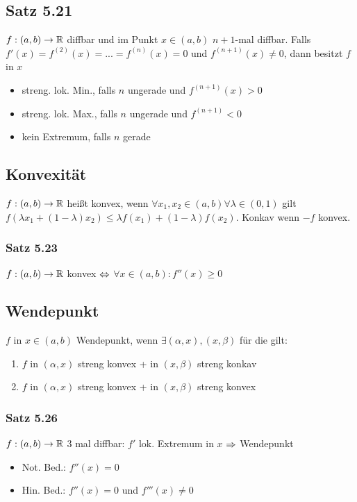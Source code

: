 \subsection*{Satz 5.21}
$f:(a, b) \rightarrow \mathbb R$ diffbar und im Punkt $x \in (a, b)$ $n +1$-mal diffbar. Falls $f'(x) = f^{(2)}(x) = ... = f^{(n)}(x) = 0$ und $f^{(n+1)}(x) \neq 0$, dann besitzt $f$ in $x$
\begin{itemize}[leftmargin=*, noitemsep]
    \item streng. lok. Min., falls $n$ ungerade und $f^{(n+1)}(x) > 0$
    \item streng. lok. Max., falls $n$ ungerade und $f^{(n+1)}< 0$
    \item kein Extremum, falls $n$ gerade
\end{itemize}
\subsection*{Konvexität}
$f:(a, b) \rightarrow \mathbb R$ heißt konvex, wenn $\forall x_1, x_2 \in (a,b)\forall \lambda\in(0,1)$ gilt $f(\lambda x_1 + (1 - \lambda) x_2) \leq \lambda f(x_1) + (1 - \lambda)f(x_2)$. Konkav wenn $-f$ konvex.
\subsubsection*{Satz 5.23}
$f:(a, b) \rightarrow \mathbb R$ konvex $\Leftrightarrow$ $\forall x \in (a, b): f''(x) \geq 0$
\subsection*{Wendepunkt}
$f$ in $x \in (a, b)$ Wendepunkt, wenn $\exists(\alpha, x), (x, \beta)$ für die gilt:
\begin{enumerate}[label=\arabic*, noitemsep]
    \item $f$ in $(\alpha, x)$ streng konvex + in $(x, \beta)$ streng konkav
    \item $f$ in $(\alpha, x)$ streng konvex + in $(x, \beta)$ streng konvex
\end{enumerate}
\subsubsection*{Satz 5.26}
$f:(a, b) \rightarrow \mathbb R$ 3 mal diffbar: $f'$ lok. Extremum in $x$ $\Rightarrow$ Wendepunkt
\begin{itemize}[noitemsep]
    \item Not. Bed.: $f''(x) = 0$
    \item Hin. Bed.: $f''(x) = 0$ und $f'''(x) \neq 0$
\end{itemize}
